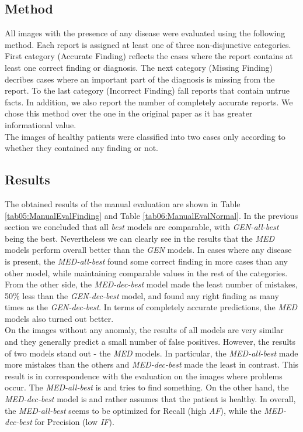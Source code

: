 \subsection{Method}
All images with the presence of any disease were evaluated using the following method. Each report is assigned at least one of three non-disjunctive categories. First category (Accurate Finding) reflects the cases where the report contains at least one correct finding or diagnosis. The next category (Missing Finding) decribes cases where an important part of the diagnosis is missing from the report. To the last category (Incorrect Finding) fall reports that contain untrue facts. In addition, we also report the number of completely accurate reports. We chose this method over the one in the original paper as it has greater informational value.\\

The images of healthy patients were classified into two cases only according to whether they contained any finding or not.

\subsection{Results}
The obtained results of the manual evaluation are shown in Table \ref{tab05:ManualEvalFinding} and Table \ref{tab06:ManualEvalNormal}. In the previous section we concluded that all \textit{best} models are comparable, with \textit{GEN-all-best} being the best. Nevertheless we can clearly see in the results that the  \textit{MED} models perform overall better than the \textit{GEN} models. In cases where any disease is present, the \textit{MED-all-best} found some correct finding in more cases than any other model, while maintaining comparable values in the rest of the categories. From the other side, the \textit{MED-dec-best} model made the least number of mistakes, 50\% less than the \textit{GEN-dec-best} model, and found any right finding as many times as the \textit{GEN-dec-best}. In terms of completely accurate predictions, the \textit{MED} models also turned out better.\\

On the images without any anomaly, the results of all models are very similar and they generally predict a small number of false positives. However, the results of two models stand out - the \textit{MED} models. In particular, the \textit{MED-all-best} made more mistakes than the others and \textit{MED-dec-best} made the least in contrast. This result is in correspondence with the evaluation on the images where problems occur. The \textit{MED-all-best} is  and tries to find something. On the other hand, the \textit{MED-dec-best} model is  and rather assumes that the patient is healthy. In overall, the \textit{MED-all-best} seems to be optimized for Recall (high \textit{AF}), while the \textit{MED-dec-best} for Precision (low \textit{IF}).\\

